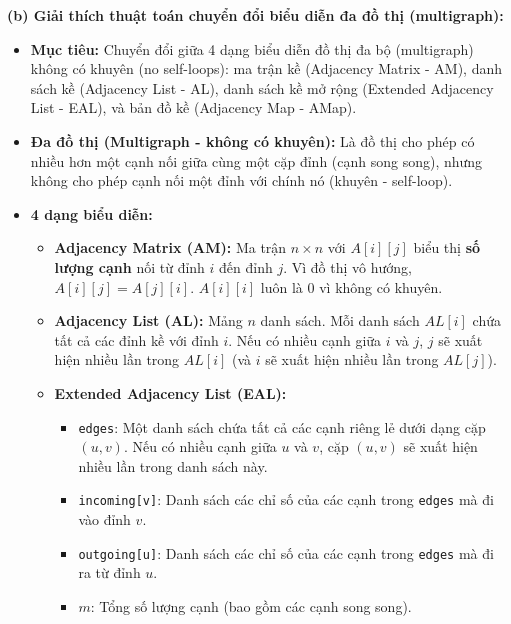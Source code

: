 \documentclass{article}
\begin{document}


\textbf{(b) Giải thích thuật toán chuyển đổi biểu diễn đa đồ thị (multigraph):}

\begin{itemize}
    \item \textbf{Mục tiêu:} Chuyển đổi giữa 4 dạng biểu diễn đồ thị đa bộ (multigraph) không có khuyên (no self-loops): ma trận kề (Adjacency Matrix - AM), danh sách kề (Adjacency List - AL), danh sách kề mở rộng (Extended Adjacency List - EAL), và bản đồ kề (Adjacency Map - AMap).
    \item \textbf{Đa đồ thị (Multigraph - không có khuyên):} Là đồ thị cho phép có nhiều hơn một cạnh nối giữa cùng một cặp đỉnh (cạnh song song), nhưng không cho phép cạnh nối một đỉnh với chính nó (khuyên - self-loop).
    \item \textbf{4 dạng biểu diễn:}
    \begin{itemize}
        \item \textbf{Adjacency Matrix (AM):} Ma trận $n \times n$ với $A[i][j]$ biểu thị \textbf{số lượng cạnh} nối từ đỉnh $i$ đến đỉnh $j$. Vì đồ thị vô hướng, $A[i][j] = A[j][i]$. $A[i][i]$ luôn là 0 vì không có khuyên.
        \item \textbf{Adjacency List (AL):} Mảng $n$ danh sách. Mỗi danh sách $AL[i]$ chứa tất cả các đỉnh kề với đỉnh $i$. Nếu có nhiều cạnh giữa $i$ và $j$, $j$ sẽ xuất hiện nhiều lần trong $AL[i]$ (và $i$ sẽ xuất hiện nhiều lần trong $AL[j]$).
        \item \textbf{Extended Adjacency List (EAL):}
        \begin{itemize}
            \item \texttt{edges}: Một danh sách chứa tất cả các cạnh riêng lẻ dưới dạng cặp $(u,v)$. Nếu có nhiều cạnh giữa $u$ và $v$, cặp $(u,v)$ sẽ xuất hiện nhiều lần trong danh sách này.
            \item \texttt{incoming[v]}: Danh sách các chỉ số của các cạnh trong \texttt{edges} mà đi vào đỉnh $v$.
            \item \texttt{outgoing[u]}: Danh sách các chỉ số của các cạnh trong \texttt{edges} mà đi ra từ đỉnh $u$.
            \item $m$: Tổng số lượng cạnh (bao gồm các cạnh song song).
        \end{itemize}

\end{itemize}
\end{itemize}
\end{document}
